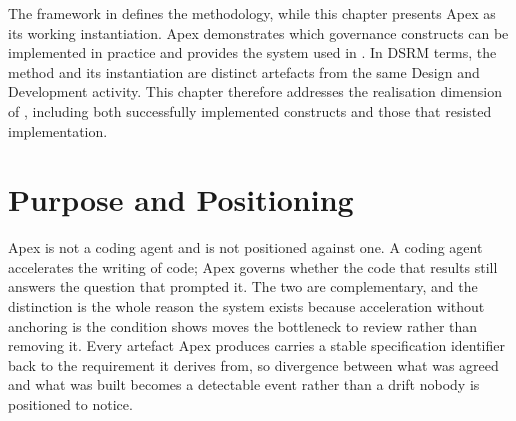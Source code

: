 \label{chap:apex}

The framework in  defines the methodology, while this chapter presents Apex as its working instantiation. Apex demonstrates which governance constructs can be implemented in practice and provides the system used in . In \ac{DSRM} terms, the method and its instantiation are distinct artefacts from the same Design and Development activity. This chapter therefore addresses the realisation dimension of , including both successfully implemented constructs and those that resisted implementation.

\section{Purpose and Positioning}
\label{sec:apex_purpose}


Apex is not a coding agent and is not positioned against one. A coding agent accelerates the writing of code; Apex governs whether the code that results still answers the question that prompted it. The two are complementary, and the distinction is the whole reason the system exists because acceleration without anchoring is the condition  shows moves the bottleneck to review rather than removing it. Every artefact Apex produces carries a stable specification identifier back to the requirement it derives from, so divergence between what was agreed and what was built becomes a detectable event rather than a drift nobody is positioned to notice.

